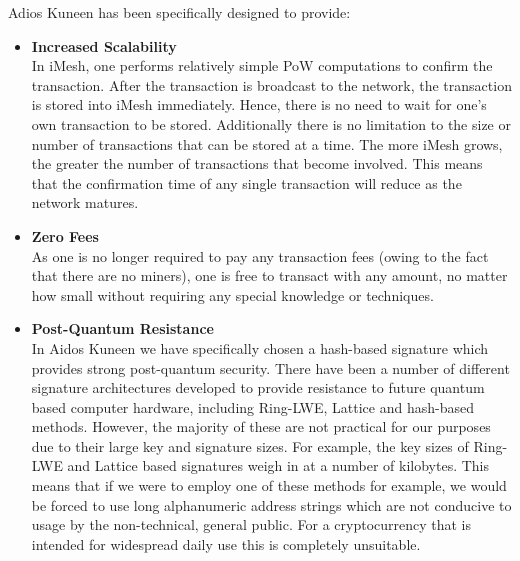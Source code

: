 \documentclass[a4paper,10pt,twocolumn]{article}
\begin{document}
	\vspace{2.5mm}
	
	Adios Kuneen has been specifically designed to provide:
	\vspace{-0.5\baselineskip}
	\begin{itemize}
		\setlength\itemsep{0em}
		\item\textbf{Increased Scalability}\mbox{}\\ 
	In iMesh, one performs relatively simple PoW computations to confirm the transaction. After the transaction is broadcast to the network,
	the transaction is stored into iMesh immediately. Hence, there is no need to wait for one's own transaction to be stored. Additionally 
	there is no limitation to the size or number of transactions that can be stored at a time. The more iMesh grows, the greater the number 
	of transactions that become involved. This means that the confirmation time of any single transaction will reduce as the network matures.
	
	\item\textbf{Zero Fees}\mbox{}\\ 
	As one is no longer required to pay any transaction fees (owing to the fact that there are no miners), one is free to 
	transact with any amount, no matter how small without requiring any special knowledge or techniques.
	
	\item\textbf{Post-Quantum Resistance}\mbox{}\\ 
	In Aidos Kuneen we have specifically chosen a hash-based signature which provides strong post-quantum security. There have been a 
	number of different signature architectures developed to provide resistance to future quantum based computer hardware, including 
	Ring-LWE, Lattice and hash-based methods. However, the majority of these are not practical for our purposes due to their large key and 
	signature sizes. For example, the key sizes of Ring-LWE and Lattice based signatures weigh in at a number of kilobytes. This means that 
	if we were to employ one of these methods for example, we would be forced to use long alphanumeric address strings which are not 
	conducive to usage by the non-technical, general public. For a cryptocurrency that is intended for widespread daily use this is 
	completely unsuitable.
	
	\vspace{2.5mm}
	

\end{itemize}
\end{document}
